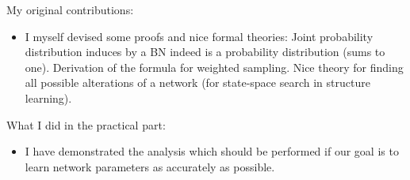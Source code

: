 \documentclass[english,cover]{fitthesis} %
\begin{document}
My original contributions:
\begin{itemize}
	\item I myself devised some proofs and nice formal theories: Joint probability distribution induces by a BN indeed is a probability distribution (sums to one). Derivation of the formula for weighted sampling. Nice theory for finding all possible alterations of a network (for state-space search in structure learning).
\end{itemize}

What I did in the practical part:
\begin{itemize}
    \item I have demonstrated the analysis which should be performed if our goal is to learn network parameters as accurately as possible.
\end{itemize}











\ifczech
  
\else 
  
%  
\fi
  \begin{flushleft}
  \end{flushleft}
  \appendix
  
\end{document}
